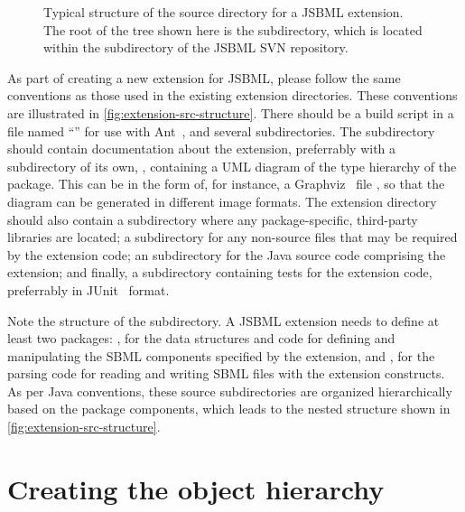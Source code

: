 \begin{wrapfigure}[23]{r}{2.31in}
  \vspace*{-2ex}
  \caption{Typical structure of the source directory for a JSBML extension.
    The root of the tree shown here is the  subdirectory,
    which is located within the  subdirectory of the JSBML SVN
    repository.}
  \label{fig:extension-src-structure}
\end{wrapfigure}
As part of creating a new extension for JSBML, please follow the same
conventions as those used in the existing extension directories.  These
conventions are illustrated in \vref{fig:extension-src-structure}.
There should be a build script in a file named ``'' for use
with Ant~\citep{ApacheAnt}, and several subdirectories.  The 
subdirectory should contain documentation about the extension, preferrably
with a subdirectory of its own, , containing a UML diagram of the
type hierarchy of the package.  This can be in the form of, for instance, a
Graphviz~\cite{graphvizWebsite} file , so that
the diagram can be generated in different image formats.  The extension
directory should also contain a  subdirectory where any
package-specific, third-party libraries are located; a 
subdirectory for any non-source files that may be required by the extension
code; an  subdirectory for the Java source code comprising the
extension; and finally, a  subdirectory containing tests for the
extension code, preferrably in JUnit~\cite{junitWebsite} format.

Note the structure of the  subdirectory. A JSBML extension needs
to define at least two packages: , for the
data structures and code for defining and manipulating the SBML components
specified by the extension, and , for the
parsing code for reading and writing SBML files with the extension
constructs.  As per Java conventions, these source subdirectories are
organized hierarchically based on the package components, which leads to
the nested structure shown in \vref{fig:extension-src-structure}.


\section{Creating the object hierarchy}


